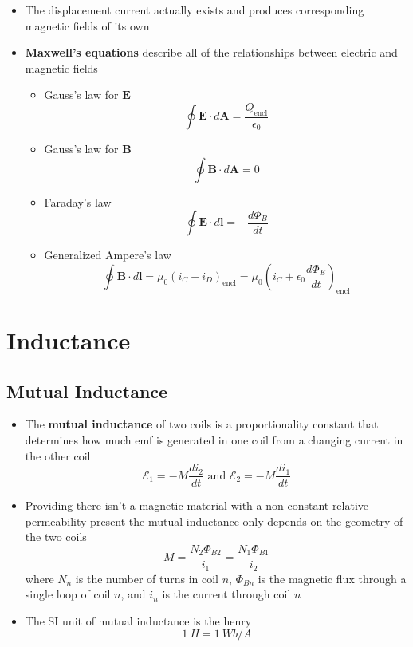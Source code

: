 \documentclass{article}
\begin{document}
\begin{itemize}
  \item The displacement current actually exists and produces corresponding magnetic fields of its own

  \item \textbf{Maxwell's equations} describe all of the relationships between electric and magnetic fields

        \begin{itemize}
          \item Gauss's law for $\mathbf{E}$ \[\oint \mathbf{E} \cdot d \mathbf{A} = \frac{Q_\text{encl}}{\epsilon_0}\]

          \item Gauss's law for $\mathbf{B}$ \[\oint \mathbf{B} \cdot d \mathbf{A} = 0\]

          \item Faraday's law \[\oint \mathbf{E} \cdot d \mathbf{l} = -\frac{d \Phi_B}{dt}\]

          \item Generalized Ampere's law \[\oint \mathbf{B} \cdot d \mathbf{l} = \mu_0 (i_C + i_D)_\text{encl} = \mu_0 (i_C + \epsilon_0 \frac{d \Phi_E}{dt})_\text{encl}\]
        \end{itemize}
\end{itemize}

\section{Inductance}

\subsection{Mutual Inductance}

\begin{itemize}
  \item The \textbf{mutual inductance} of two coils is a proportionality constant that determines how much emf is generated in one coil from a changing current in the other coil \[\mathcal{E}_1 = -M \frac{di_2}{dt}\text{ and }\mathcal{E}_2 = -M \frac{di_1}{dt}\]

  \item Providing there isn't a magnetic material with a non-constant relative permeability present the mutual inductance only depends on the geometry of the two coils \[M = \frac{N_2 \Phi_{B2}}{i_1} = \frac{N_1 \Phi_{B1}}{i_2}\] where $N_n$ is the number of turns in coil $n$, $\Phi_{Bn}$ is the magnetic flux through a single loop of coil $n$, and $i_n$ is the current through coil $n$

  \item The SI unit of mutual inductance is the henry \[\qty{1}{H} = \qty{1}{Wb/A}\]
\end{itemize}
\end{document}
